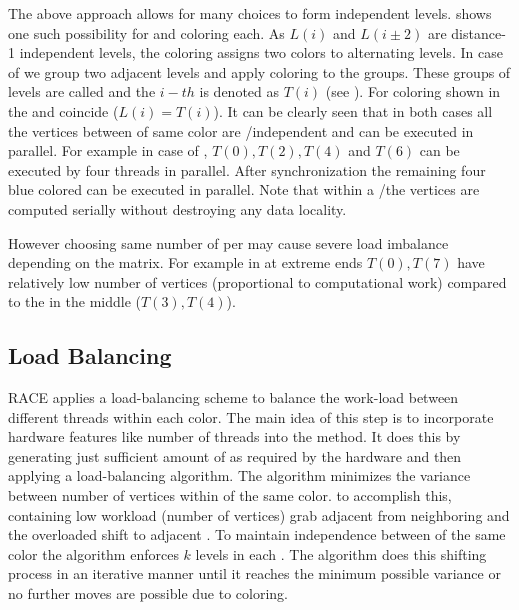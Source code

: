   \setlength{\belowcaptionskip}{0pt}
The above approach allows for many choices to form \DK independent levels.  shows 
one such possibility for \DONE and \DTWO coloring each. As $L(i)$ and $L(i\pm2)$ are
distance-1 independent levels, the \DONE coloring  assigns
two colors to alternating levels.  In case of \DTWO we group two adjacent levels and apply \DONE
coloring to the groups. These groups of levels are called \levelGroups
 and the $i-th$ \levelGroup is denoted as $T(i)$ (see ).
For \DONE coloring shown in  the \levels and \levelGroups
coincide ($L(i) = T(i)$).
It can be clearly seen that in both cases
 all the vertices  between \levelGroups of same color
  are \DONE/\DTWO independent  and can be executed in parallel.
   For example in case of \DTWO, \levelGroups $T(0), T(2), T(4)$
 and $T(6)$ can be executed by four threads in parallel. After synchronization the remaining 
 four blue colored \levelGroups can be executed in parallel. Note that
 within a \levelGroup/\level the vertices are computed serially without destroying
 any data locality.

However choosing same number of \levels per \levelGroup may cause severe
load imbalance depending on the matrix. For example in  
 \levelGroups at extreme ends $T(0), T(7)$  have relatively low number of 
 vertices (proportional to computational work)  compared to the \levelGroups 
 in the middle ($T(3),T(4)$).


\subsection{Load Balancing}
\Acrshort{RACE} applies a load-balancing scheme to balance the work-load
between different threads within each color. The main idea of this step
is to incorporate hardware features like number of threads into the 
method. It does this by generating just sufficient amount of \levelGroups 
as required by the hardware and then applying a load-balancing algorithm.
The algorithm minimizes the variance between number of vertices 
within \levelGroups of the same color. \Inorder to
 accomplish this, \levelGroups containing low workload (number of vertices)
 grab adjacent \levels from neighboring \levelGroups and the overloaded
 \levelGroups shift \levels to adjacent \levelGroups. To maintain
 \DK independence between \levelGroups of the same color the algorithm enforces \atleast $k$ levels in each \levelGroup. The algorithm 
 does this shifting process in an iterative manner until it reaches the
 minimum possible variance or no further moves are possible due to
 \DK coloring.
 
